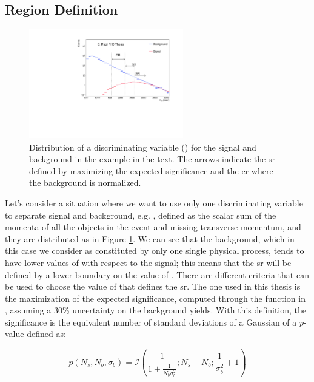 \subsection{Region Definition}
\label{sec:example_sr}

\begin{figure}[h]
\centering 
\includegraphics[width=0.6\textwidth]{produce_plots/stat/sig_bkg_CR.pdf}
\caption{Distribution of a discriminating variable (\meff) for the signal and background in the example in the text. 
The arrows indicate the \gls{sr} defined by maximizing the expected significance and the \gls{cr} where the background is normalized. 
}
\label{fig:stat:example}
\end{figure}

Let's consider a situation where we want to use only one discriminating variable to separate signal and background, e.g. \meff, defined as the scalar sum of the momenta of all the objects in the event and missing transverse momentum, 
and they are distributed as in Figure \ref{fig:stat:example}. 
We can see that the background, which in this case we consider as constituted by only one single physical process, 
tends to have lower values of \meff with respect to the signal; 
this means that the \gls{sr} will be defined by a lower boundary on the value of \meff.
There are different criteria that can be used to choose the value of \meff that defines the \gls{sr}. 
The one used in this thesis is the maximization of the expected significance, computed through the function \binexpZ in \roostats \cite{Moneta:2010pm}, 
assuming a 30\% uncertainty on the background yields. With this definition, the significance is the equivalent number of standard deviations of a Gaussian of a $p$-value defined as:

\begin{equation}
\label{eq:binomexpp}
p(N_s, N_b, \sigma_b) = \mathcal{I} \left( \frac{1}{1+ \frac{1}{N_b \sigma_b^2}}; N_s + N_b; \frac{1}{\sigma_b^2} +1  \right)
\end{equation}

